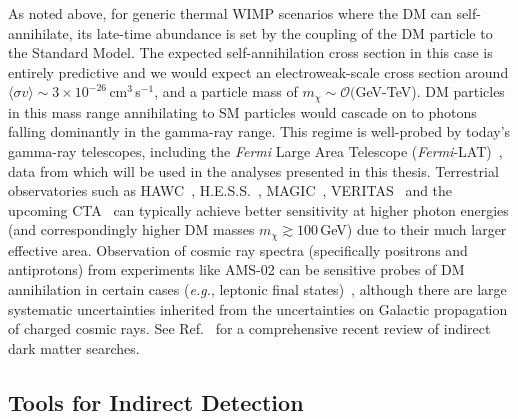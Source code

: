 As noted above, for generic thermal WIMP scenarios where the DM can self-annihilate, its late-time abundance is set by the coupling of the DM particle to the Standard Model. The expected self-annihilation cross section in this case is entirely predictive and we would expect an electroweak-scale cross section around $\langle\sigma v\rangle\sim 3\times10^{-26}$\,cm$^3$\,s$^{-1}$, and a particle mass of $m_\chi\sim\mathcal O($GeV-TeV). DM particles in this mass range annihilating to SM particles would cascade on to photons falling dominantly in the gamma-ray range. This regime is well-probed by today's gamma-ray telescopes, including the \emph{Fermi} Large Area Telescope (\emph{Fermi}-LAT)~\cite{Atwood:2009ez}, data from which will be used in the analyses presented in this thesis. Terrestrial observatories such as HAWC~\cite{Abeysekara:2014ffg}, H.E.S.S.~\cite{Abdallah:2018qtu}, MAGIC~\cite{Ahnen:2017pqx}, VERITAS~\cite{Archambault:2017wyh} and the upcoming CTA~\cite{Doro:2012xx} can typically achieve better sensitivity at higher photon energies (and correspondingly higher DM masses $m_\chi\gtrsim 100$\,GeV) due to their much larger effective area. Observation of cosmic ray spectra (specifically positrons and antiprotons) from experiments like AMS-02 can be sensitive probes of DM annihilation in certain cases (\emph{e.g.}, leptonic final states)~\cite{Aguilar:2014mma,Bergstrom:2013jra}, although there are large systematic uncertainties inherited from the uncertainties on Galactic propagation of charged cosmic rays. See Ref.~\cite{Slatyer:2017sev} for a comprehensive recent review of indirect dark matter searches.   %

\subsection{Tools for Indirect Detection}
\label{subsec:tools}

